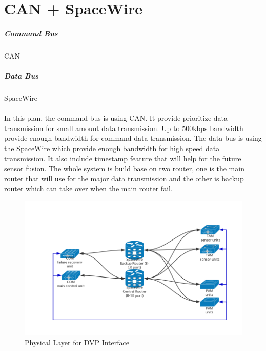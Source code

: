 \documentclass[12pt,article]{memoir}
\begin{document}
\section{CAN + SpaceWire}
\subparagraph{Command Bus}CAN
\subparagraph{Data Bus}SpaceWire\\\\
In this plan, the command bus is using CAN. It provide prioritize data transmission for small amount data transmission. Up to 500kbps bandwidth provide enough bandwidth for command data transmission. The data bus is using the SpaceWire which provide enough bandwidth for high speed data transmission. It also include timestamp feature that will help for the future sensor fusion. The whole system is build base on two router, one is the main router that will use for the major data transmission and the other is backup router which can take over when the main router fail.
\begin{figure}[htp]
\includegraphics[width=\textwidth]{DR00001_SpaceWire_1.png}
 \caption{Physical Layer for DVP Interface}	
\end{figure}
\clearpage
\end{document}
